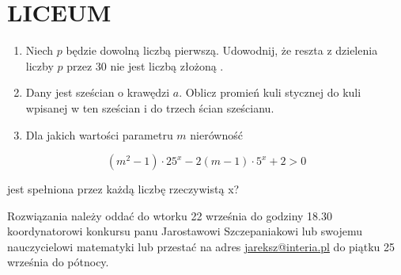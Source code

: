 \documentclass[10pt]{article}
\begin{document}
\section*{LICEUM}
\begin{enumerate}
  \item Niech \(p\) będzie dowolną liczbą pierwszą. Udowodnij, że reszta z dzielenia liczby \(p\) przez 30 nie jest liczbą złożoną .
  \item Dany jest sześcian o krawędzi \(a\). Oblicz promień kuli stycznej do kuli wpisanej w ten sześcian i do trzech ścian sześcianu.
  \item Dla jakich wartości parametru \(m\) nierówność
\end{enumerate}

\[
\left(m^{2}-1\right) \cdot 25^{x}-2(m-1) \cdot 5^{x}+2>0
\]

jest spełniona przez każdą liczbę rzeczywistą x?

Rozwiązania należy oddać do wtorku 22 września do godziny 18.30 koordynatorowi konkursu panu Jarostawowi Szczepaniakowi lub swojemu nauczycielowi matematyki lub przestać na adres \href{mailto:jareksz@interia.pl}{jareksz@interia.pl} do piątku 25 września do pótnocy.
\end{document}
